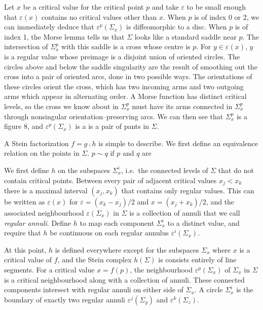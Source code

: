 Let $x$ be a critical value for the critical point $p$ and take $\varepsilon$ to be small enough that $\varepsilon(x)$ contains no critical values other than $x$.
When $p$ is of index 0 or 2, we can immediately deduce that $\varepsilon^p(\Sigma_x)$ is diffeomorphic to a disc.
When $p$ is of index 1, the Morse lemma tells us that $\Sigma$ looks like a standard saddle near $p$.
The intersection of $\Sigma_x^p$ with this saddle is a cross whose centre is $p$.
For $y\in\varepsilon(x)$, $y$ is a regular value whose preimage is a disjoint union of oriented circles.
The circles above and below the saddle singularity are the result of smoothing out the cross into a pair of oriented arcs, done in two possible ways.
The orientations of these circles orient the cross, which has two incoming arms and two outgoing arms which appear in alternating order.
A Morse function has distinct critical levels, so the cross we know about in $\Sigma_x^p$ must have its arms connected in $\Sigma_x^p$ through nonsingular orientation--preserving arcs.
We can then see that $\Sigma_x^p$ is a figure 8, and $\varepsilon^p(\Sigma_x)$ is a is a pair of pants in $\Sigma$.

A Stein factorization $f=g\comp h$ is simple to describe.
We first define an equivalence relation on the points in $\Sigma$.
 $p\sim q$ if $p$ and $q$ are 

We first define $h$ on the subspaces $\Sigma_x^i$, i.e.\ the connected levels of $\Sigma$ that do not contain critical points.
Between every pair of adjacent critical values $x_j < x_k$ there is a maximal interval $(x_j,x_k)$ that contains only regular values.
This can be written as $\varepsilon(x)$ for $\varepsilon=(x_k-x_j)/2$ and $x=(x_j+x_k)/2$, and the associated neighbourhood $\varepsilon(\Sigma_x)$ in $\Sigma$ is a collection of annuli that we call \emph{regular annuli}.
Define $h$ to map each component $\Sigma_x^i$ to a distinct value, and require that $h$ be continuous on each regular annulus $\varepsilon^i(\Sigma_x)$.

At this point, $h$ is defined everywhere except for the subspaces $\Sigma_x$ where $x$ is a critical value of $f$, and the Stein complex $h(\Sigma)$ is consists entirely of line segments.
For a critical value $x=f(p)$, the neighbourhood $\varepsilon^p(\Sigma_x)$ of $\Sigma_x$ in $\Sigma$ is a critical neighbourhood along with a collection of annuli.
These connected components intersect with regular annuli on either side of $\Sigma_x$.
A circle $\Sigma_x^i$ is the boundary of exactly two regular annuli $\varepsilon^j(\Sigma_y)$ and $\varepsilon^k(\Sigma_z)$.

